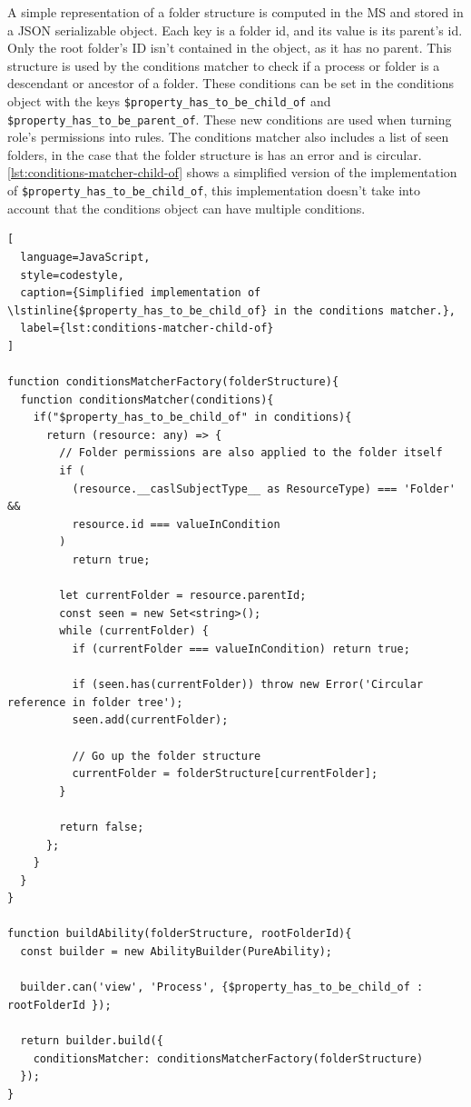 
A simple representation of a folder structure is computed in the MS
and stored in a JSON serializable object.
Each key is a folder id, and its value is its parent's id.
Only the root folder's ID isn't contained in the object, as it has no parent.
This structure is used by the conditions matcher to check if a process or folder is a
descendant or ancestor of a folder.
These conditions can be set in the conditions object with the keys
\lstinline{$property_has_to_be_child_of} and \lstinline{$property_has_to_be_parent_of}.
These new conditions are used when turning role's permissions into rules.
The conditions matcher also includes a list of seen folders, in the case that the folder
structure is has an error and is circular.
\ref{lst:conditions-matcher-child-of} shows a simplified version of the implementation of
\lstinline{$property_has_to_be_child_of}, this implementation doesn't take into account
that the conditions object can have multiple conditions.

\begin{lstlisting}[
  language=JavaScript,
  style=codestyle,
  caption={Simplified implementation of \lstinline{$property_has_to_be_child_of} in the conditions matcher.},
  label={lst:conditions-matcher-child-of}
]

function conditionsMatcherFactory(folderStructure){
  function conditionsMatcher(conditions){
    if("$property_has_to_be_child_of" in conditions){
      return (resource: any) => {
        // Folder permissions are also applied to the folder itself
        if (
          (resource.__caslSubjectType__ as ResourceType) === 'Folder' &&
          resource.id === valueInCondition
        )
          return true;

        let currentFolder = resource.parentId;
        const seen = new Set<string>();
        while (currentFolder) {
          if (currentFolder === valueInCondition) return true;

          if (seen.has(currentFolder)) throw new Error('Circular reference in folder tree');
          seen.add(currentFolder);

          // Go up the folder structure
          currentFolder = folderStructure[currentFolder];
        }

        return false;
      };
    }
  }
}

function buildAbility(folderStructure, rootFolderId){
  const builder = new AbilityBuilder(PureAbility);

  builder.can('view', 'Process', {$property_has_to_be_child_of : rootFolderId });

  return builder.build({
    conditionsMatcher: conditionsMatcherFactory(folderStructure) 
  });
}
\end{lstlisting}

